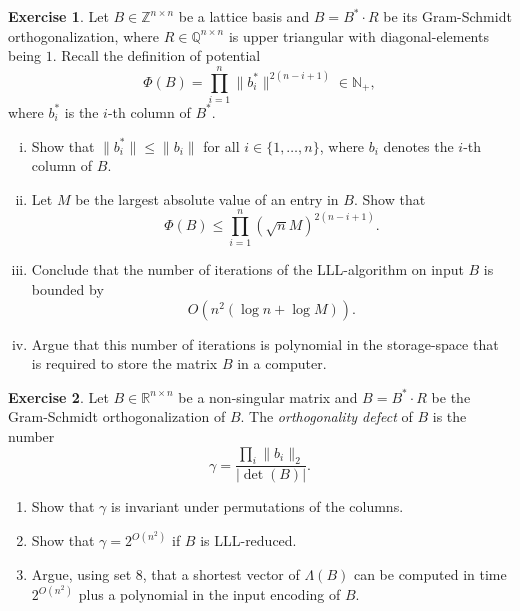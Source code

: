 \documentclass[12pt,a4paper]{article}
\theoremstyle{plain}
\newtheorem*{Sol*}{Solution}
\theoremstyle{definition}
\newtheorem{Ex}{Exercise}
\newif\ifsolutions
\newcommand{\exercise}[2]{
			\begin{Ex} #1 \end{Ex}
			\ifsolutions  \begin{Sol*} #2 \end{Sol*} \bigskip \else \bigskip  \fi
		}
\begin{document}
\exercise{
  Let $B ∈ ℤ^{ n ×n}$ be a lattice basis and $Β= B^* ⋅ R$ be its Gram-Schmidt orthogonalization, where $R ∈ ℚ^{n ×n}$ is upper triangular with diagonal-elements being $1$. Recall the definition of potential
  \begin{displaymath}
    Φ(B) = ∏_{i=1}^n \|b_i^*\|^{2 (n-i+1)} ∈ℕ_+, 
  \end{displaymath}
  where $b_i^*$ is the $i$-th column of $B^*$. 

  \begin{enumerate}[i)]   
  \item Show that $\|b_i^* \| ≤ \|b_i\|$ for all $i ∈ \{1,\dots,n\}$, where $b_i$ denotes the $i$-th column of $B$. 
  \item Let $M$ be the largest absolute value of an entry in $B$. Show that
    \begin{displaymath}
       Φ(B) \leq ∏_{i=1}^n (\sqrt{n} M)^{2 (n-i+1)}. 
     \end{displaymath}
   \item Conclude that the number of iterations of the LLL-algorithm on input $B$ is bounded by
     \begin{displaymath}
       O(n^2 (\log n + \log M)).       
     \end{displaymath}
   \item Argue that this number of iterations is polynomial in the storage-space that is required to store the matrix $B$ in a computer. 
  \end{enumerate}
}{}

\exercise{
  Let $Β∈ ℝ^{n ×n}$ be a non-singular matrix and $B = B^* ⋅ R$ be the Gram-Schmidt orthogonalization  of $B$. The \emph{orthogonality defect} of $B$ is the number
  \begin{displaymath}
    γ = \frac{∏_i \| b_i \|_2}{|\det(B)|}.  
  \end{displaymath}

  \begin{enumerate}
  \item Show that $γ$ is invariant under permutations of the columns. 
  \item Show that $γ = 2^{O(n^2)}$ if $B$ is LLL-reduced.
  \item  Argue, using set 8, that a shortest vector of $Λ(B)$ can be computed in time $2^{O(n^2)}$ plus  a polynomial in the input encoding of $B$. 
  \end{enumerate}
}{}
\end{document}
